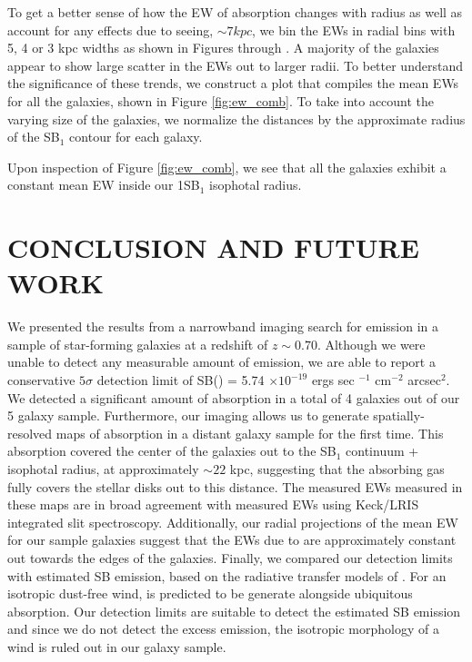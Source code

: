\documentclass[twocolumn]{aastex61}
\begin{document}
To get a better sense of how the EW of  absorption changes with radius as well as account for any effects due to seeing, $\sim 7 kpc$, we bin the EWs in radial bins with 5, 4 or 3 kpc widths as shown in Figures \label{fig:ew1} through \label{fig:ew5}. A majority of the galaxies appear to show large scatter in the EWs out to larger radii. To better understand the significance of these trends, we construct a plot that compiles the mean EWs for all the galaxies, shown in Figure \ref{fig:ew_comb}. To take into account the varying size of the galaxies, we normalize the distances by the approximate radius of the SB$_1$ contour for each galaxy. 

Upon inspection of Figure \ref{fig:ew_comb}, we see that all the galaxies exhibit a constant mean EW inside our 1SB$_1$ isophotal radius.

\section{CONCLUSION AND FUTURE WORK}
We presented the results from a narrowband imaging search for  emission in a sample of star-forming galaxies at a redshift of $z \sim 0.70$.  Although we were unable to detect any measurable amount of  emission, we are able to report a conservative $5\sigma$ detection limit of  SB() = 5.74 $\times 10^{-19}$ ergs sec $^{-1}$ cm$^{-2}$ arcsec$^2$. We detected a significant amount of  absorption in a total of 4 galaxies out of our 5 galaxy sample. Furthermore, our imaging allows us to generate spatially-resolved maps of  absorption in a distant galaxy sample for the first time. This absorption covered the center of the galaxies out to the SB$_1$ continuum +  isophotal radius, at approximately $\sim 22$ kpc, suggesting that the absorbing gas fully covers the stellar disks out to this distance. The measured EWs measured in these maps are in broad agreement with measured EWs using Keck/LRIS integrated slit spectroscopy. Additionally, our radial projections of the mean EW for our sample galaxies suggest that the EWs due to  are approximately constant out towards the edges of the galaxies. Finally, we compared our detection limits with estimated SB  emission, based on the radiative transfer models of \cite{Prochaska_2011}. For an isotropic dust-free wind,  is predicted to be generate alongside ubiquitous  absorption. Our detection limits are suitable to detect the estimated SB  emission and since we do not detect the excess emission, the  isotropic morphology of a wind is ruled out in our galaxy sample.
\end{document}
